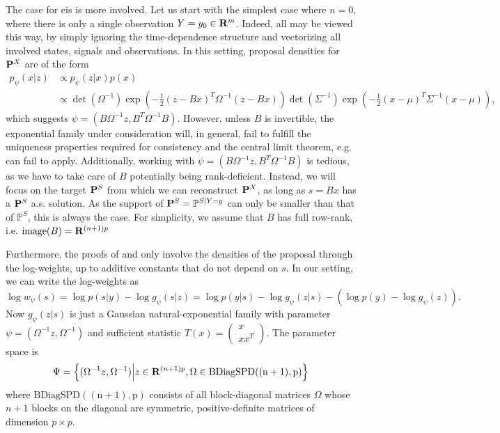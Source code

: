 The case for \acrshort{eis} is more involved. Let us start with the simplest case where $n=0$, where there is only a single observation $Y = y_{0} \in \R^{m}$. Indeed, all  may be viewed this way, by simply ignoring the time-dependence structure and vectorizing all involved states, signals and observations. 
In this setting, proposal densities for $\P^{X}$ are of the form 
\begin{align*}
    p_{\psi}(x|z) &\propto p_{\psi}(z|x) p(x) \\
    &\propto \det(\Omega^{-1}) \exp \left( - \frac{1}{2} (z-Bx)^{T}\Omega^{-1}(z - Bx) \right) \det (\Sigma^{-1}) \exp \left( - \frac{1}{2}(x - \mu)^{T}\Sigma^{-1} (x - \mu) \right),
\end{align*}
which suggests $\psi = \left( B\Omega ^{-1}z, B^{T}\Omega^{-1}B \right)$. However, unless $B$ is invertible, the exponential family under consideration will, in general, fail to fulfill the uniqueness properties required for consistency and the central limit theorem, e.g.  can fail to apply. Additionally, working with $\psi = \left( B\Omega ^{-1}z, B^{T}\Omega^{-1}B \right)$ is tedious, as we have to take care of $B$ potentially being rank-deficient. Instead, we will focus on the target $\P^{S}$ from which we can reconstruct $\P^{X}$, as long as $s = Bx$ has a $\P^{S}$ a.s. solution. As the support of $\P^{S} = \mathbb P^{S | Y = y}$ can only be smaller than that of $\mathbb P^{S}$, this is always the case. For simplicity, we assume that $B$ has full row-rank, i.e. $\operatorname{image}(B) = \R^{(n+1)p}$

Furthermore, the proofs of  and  only involve the densities of the proposal through the log-weights, up to additive constants that do not depend on $s$. In our setting, we can write the log-weights as 
$$
    \log w_{\psi}(s) = \log p(s|y) - \log g_{\psi}(s|z) = \log p(y|s) - \log  g_{\psi}(z|s) - (\log p(y) -  \log g_\psi(z)).
$$
Now $g_{\psi}(z|s)$ is just a Gaussian natural-exponential family with parameter $\psi = (\Omega^{-1}z, \Omega^{-1})$ and sufficient statistic $T(x) = \begin{pmatrix} x\\xx^{T} \end{pmatrix}$. The parameter space is 
$$
    \Psi = \left\{ (\Omega^{-1}z, \Omega^{-1}) \middle|
        z \in \R^{(n+1)p}, \Omega \in \operatorname{BDiagSPD((n+1),p)}
    \right\}
$$
where $\operatorname{BDiagSPD((n+1),p)}$ consists of all block-diagonal matrices $\Omega$ whose $n+1$ blocks on the diagonal are symmetric, positive-definite matrices of dimension $p\times p$.

